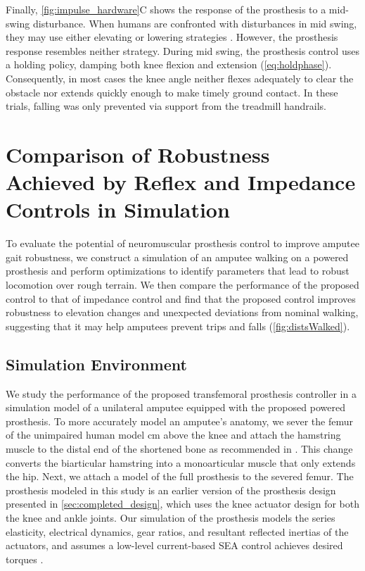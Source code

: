 Finally, \cref{fig:impulse_hardware}C shows the response of the
prosthesis to a mid-swing disturbance. When humans are confronted with
disturbances in mid swing, they may use either elevating or lowering strategies
\citep{eng1994strategies, schillings2000muscular}. However, the prosthesis
response resembles neither strategy. During mid swing, the prosthesis control
uses a holding policy, damping both knee flexion and extension
(\cref{eq:holdphase}). Consequently, in most cases the knee angle neither
flexes adequately to clear the obstacle nor extends quickly enough to make
timely ground contact. In these trials, falling was only prevented via support
from the treadmill handrails.

\section{Comparison of Robustness Achieved by Reflex and Impedance Controls in
    Simulation}\label{sec:completed_comparison}

To evaluate the potential of neuromuscular prosthesis control to improve amputee
gait robustness, we construct a simulation of an amputee walking on a powered
prosthesis and perform optimizations to identify parameters that lead to robust
locomotion over rough terrain. We then compare the performance of the proposed
control to that of impedance control and find that the proposed control improves
robustness to elevation changes and unexpected deviations from nominal walking,
suggesting that it may help amputees prevent trips and falls
(\cref{fig:distsWalked}).

\subsection{Simulation Environment}\label{sec:complete_simulation_environ}
We study the performance of the proposed transfemoral prosthesis controller in a
simulation model of a unilateral amputee equipped with the proposed powered
prosthesis. To more accurately model an amputee's anatomy, we sever the femur of
the unimpaired human model \unit[11]{cm} above the knee and attach the hamstring
muscle to the distal end of the shortened bone as recommended in
\citet{brown2012amputation}. This change converts the biarticular hamstring into
a monoarticular muscle that only extends the hip. Next, we attach a model of the
full prosthesis to the severed femur. The prosthesis modeled in this study is an
earlier version of the prosthesis design presented in
\cref{sec:completed_design}, which uses the knee actuator design for both the
knee and ankle joints. Our simulation of the prosthesis models the series
elasticity, electrical dynamics, gear ratios, and resultant reflected inertias
of the actuators, and assumes a low-level current-based SEA control achieves
desired torques \citep{pratt1995series}.

